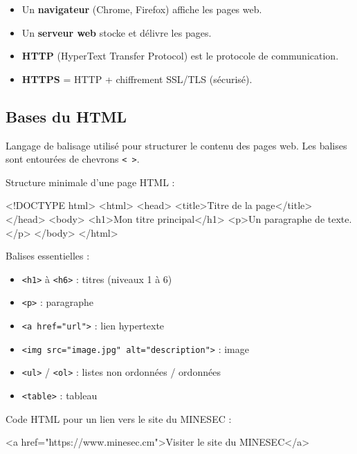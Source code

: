 \begin{aretenir}
\begin{itemize}
    \item Un \textbf{navigateur} (Chrome, Firefox) affiche les pages web.
    \item Un \textbf{serveur web} stocke et délivre les pages.
    \item \textbf{HTTP} (HyperText Transfer Protocol) est le protocole de communication.
    \item \textbf{HTTPS} = HTTP + chiffrement SSL/TLS (sécurisé).
\end{itemize}
\end{aretenir}

\subsection{Bases du HTML}
\begin{definition}
Langage de balisage utilisé pour structurer le contenu des pages web. Les balises sont entourées de chevrons \texttt{< >}.
\end{definition}

Structure minimale d'une page HTML :
\begin{ccode}
<!DOCTYPE html>
<html>
  <head>
    <title>Titre de la page</title>
  </head>
  <body>
    <h1>Mon titre principal</h1>
    <p>Un paragraphe de texte.</p>
  </body>
</html>
\end{ccode}

Balises essentielles :
\begin{itemize}
    \item \texttt{<h1>} à \texttt{<h6>} : titres (niveaux 1 à 6)
    \item \texttt{<p>} : paragraphe
    \item \texttt{<a href="url">} : lien hypertexte
    \item \texttt{<img src="image.jpg" alt="description">} : image
    \item \texttt{<ul>} / \texttt{<ol>} : listes non ordonnées / ordonnées
    \item \texttt{<table>} : tableau
\end{itemize}

\begin{exemple}
Code HTML pour un lien vers le site du MINESEC :
\begin{ccode}
<a href="https://www.minesec.cm">Visiter le site du MINESEC</a>
\end{ccode}
\end{exemple}


